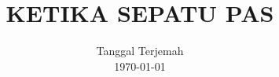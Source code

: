


%




\title{KETIKA SEPATU PAS}
\date{Tanggal Terjemah\\
      \today}
\maketitle\thispagestyle{empty}
\pagestyle{empty}
\tableofcontents
\fancychapterstyle

\pagestyle{mystyle}
\setcounter{page}{1}
\ifdefined\theHchapter\else\newcommand\theHchapter{\arabic{chapter}}\fi


